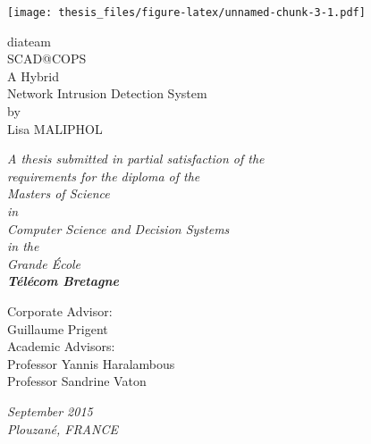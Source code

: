 
\maketitle


\texttt{[image: thesis\_files/figure-latex/unnamed-chunk-3-1.pdf]}

\thispagestyle{empty}

\newpage
\thispagestyle{empty} \mbox{}

\clearpage
{}

\begin{center}

\vspace{30mm}

{\Huge diateam}\\
\bigskip
{\Huge SCAD@COPS}\\
\bigskip
\bigskip
{\Huge A Hybrid}\\
{\Huge Network Intrusion Detection System}\\
\vspace{15mm}
{\Large by}\\
\vspace{10mm}
{\huge Lisa MALIPHOL}\\

\vspace{25mm}

\textit{A thesis submitted in partial satisfaction of the}\\
\medskip
\textit{requirements for the diploma of the}\\
\medskip
\textit{Masters of Science}\\
\medskip
\textit{in}\\
\medskip
\textit{Computer Science and Decision Systems}\\
\medskip
\textit{in the}\\
\medskip
\textit{Grande École}\\
\medskip
\textbf{\textit{\Large Télécom Bretagne}}\\

\vspace{15mm}

Corporate Advisor:\\
\smallskip
Guillaume Prigent\\
\bigskip
\medskip
Academic Advisors:\\
\smallskip
Professor Yannis Haralambous\\
Professor Sandrine Vaton\\

\vspace{15mm}

\textit{September 2015}\\
\medskip
\textit{Plouzané, FRANCE}\\

\end{center}

